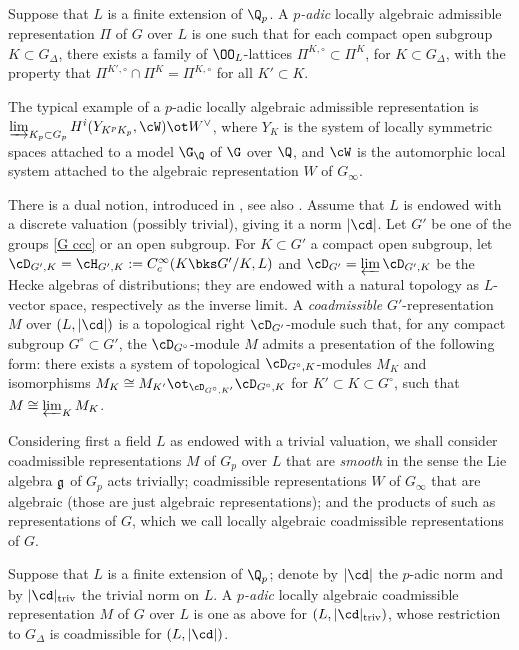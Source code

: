 \begin{defi}
\notready {} Suppose  that $L$ is a finite extension of $\Q_{p}$.
A \emph{$p$-adic} locally algebraic admissible  representation $\Pi$ of $G$ over $L$ is one such that for each compact open subgroup $K\subset G_{\Delta}$,
there exists a family of  $\OO_{L}$-lattices $\Pi^{K, \circ}\subset \Pi^{K}$, for $K\subset G_{\Delta}$,  with the property that  $\Pi^{K', \circ}\cap \Pi^{K}= \Pi^{K, \circ}$ for all $K'\subset K$.
\end{defi}
The typical example of  a $p$-adic locally algebraic admissible  representation is
$\varinjlim_{K_{p}\subset G_{p}} H^{i}(Y_{K^{p}K_{p}}, \cW)\ot W^{\vee}$, where $Y_{K}$ is the system of  locally symmetric spaces attached to a model $\G_{\Q}$ of $\G$ over $\Q$, and $\cW$ is the automorphic local system attached to the algebraic representation  $W$ of $G_{\infty}$.



There is a dual notion, introduced in  \cite[p. 152]{Sch-T}, see also \cite{Sch-T2}. Assume that $L$ is endowed with a discrete valuation (possibly trivial), giving it a  norm $|\cd|$. Let  $G'$ be one of the groups \eqref{G ccc} or an open subgroup. For $K\subset G'$ a compact open subgroup,  let  $\cD_{G',K}=\cH_{G', K}:=C^{\infty}_{c}(K\bks G'/K,L)$ and $\cD_{G'}=\varprojlim \cD_{G',K}$ be the Hecke algebras of distributions; they are endowed with a natural topology as $L$-vector space, respectively as the inverse limit. A \emph{coadmissible} $G'$-representation $M$ over $(L, |\cd|)$ is  a topological right $\cD_{G'}$-module such that, for any compact subgroup $G^{\circ}\subset G'$,  the $\cD_{G^{\circ}}$-module $M$   admits a presentation  of the following form: there exists a  system of  topological $\cD_{G^{\circ}, K}$-modules $M_{K}$ and isomorphisms  $M_{K}\cong M_{K'}\ot_{\cD_{G^{\circ}, K'}} \cD_{G^{\circ}, K}$ for  $K'\subset K\subset G^{\circ}$, such that   $M\cong \varprojlim_{K} M_{K}$.

Considering first a field  $L$ as endowed with a trivial valuation, we shall consider coadmissible representations $M$ of $G_{p}$ over $L$ that are \emph{smooth} in the sense  the Lie algebra $\frak g$ of $G_{p}$ acts trivially; coadmissible representations $W$  of $G_{\infty}$ that are algebraic (those are just algebraic representations); and the products of such as representations of $G$, which we call locally algebraic coadmissible representations of $G$.

\begin{defi}
\notready  {} Suppose  that $L$ is a finite extension of $\Q_{p}$; denote by $|\cd|$ the $p$-adic norm and by $|\cd|_{\rm triv}$ the trivial norm on $L$.
A \emph{$p$-adic} locally algebraic coadmissible  representation $M$ of $G$ over $L$  is one as above for $(L, |\cd|_{\rm triv})$, whose restriction to $G_{\Delta}$ is coadmissible for $(L, |\cd|)$.
\end{defi}

